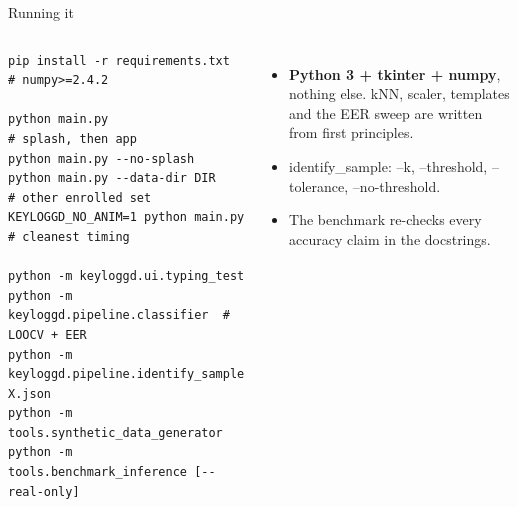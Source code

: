 \documentclass[aspectratio=169,11pt,t]{beamer}
\newcommand\code[1]{{\ttfamily\color{terradk}#1}}
\begin{document}
\begin{frame}[fragile]{Running it}
\begin{columns}[T,onlytextwidth]
\begin{tcolorbox}[enhanced,colback=ink,colframe=ink,arc=6pt,left=2pt,right=2pt,top=6pt,bottom=6pt,
  fuzzy shadow={0.4pt}{-0.9pt}{0pt}{0.35pt}{black!20}]
\begin{lstlisting}[style=shell]
pip install -r requirements.txt   # numpy>=2.4.2

python main.py                    # splash, then app
python main.py --no-splash
python main.py --data-dir DIR     # other enrolled set
KEYLOGGD_NO_ANIM=1 python main.py # cleanest timing

python -m keyloggd.ui.typing_test
python -m keyloggd.pipeline.classifier  # LOOCV + EER
python -m keyloggd.pipeline.identify_sample X.json
python -m tools.synthetic_data_generator
python -m tools.benchmark_inference [--real-only]
\end{lstlisting}
\end{tcolorbox}

\small
\begin{itemize}\setlength\itemsep{4pt}
\item \textbf{Python 3 + tkinter + numpy}, nothing else. kNN, scaler, templates and the EER sweep are written from first principles.
\item \code{identify\_sample}: \code{--k}, \code{--threshold}, \code{--tolerance}, \code{--no-threshold}.
\item The benchmark re-checks every accuracy claim in the docstrings.
\end{itemize}
\end{columns}
\end{frame}
\end{document}
